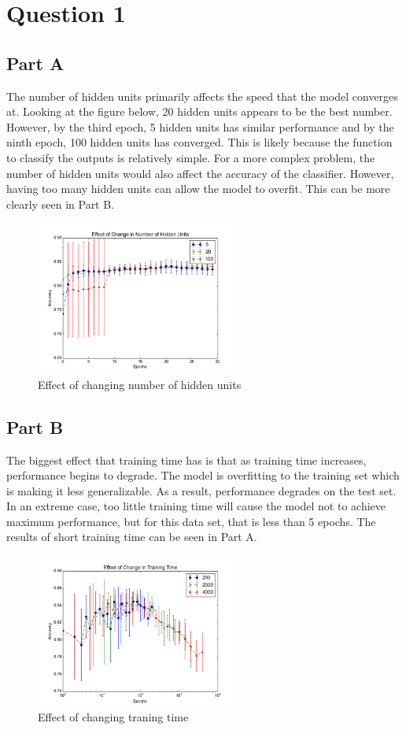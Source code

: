 \section{Question 1}
\subsection{Part A}
The number of hidden units primarily affects the speed that the model converges at.  Looking at the figure below, 20 hidden units appears to be the best number.  However, by the third epoch, 5 hidden units has similar performance and by the ninth epoch, 100 hidden units has converged.  This is likely because the function to classify the outputs is relatively simple.  For a more complex problem, the number of hidden units would also affect the accuracy of the classifier.  However, having too many hidden units can allow the model to overfit.  This can be more clearly seen in Part B.
\begin{figure}[H]
	\centering
	\includegraphics[width=0.6\textwidth]{../train1/hidden_units.png}
	\caption{Effect of changing number of hidden units}
\end{figure}

\subsection{Part B}
The biggest effect that training time has is that as training time increases, performance begins to degrade.  The model is overfitting to the training set which is making it less generalizable.  As a result, performance degrades on the test set.  In an extreme case, too little training time will cause the model not to achieve maximum performance, but for this data set, that is less than 5 epochs.  The results of short training time can be seen in Part A.
\begin{figure}[H]
	\centering
	\includegraphics[width=0.6\textwidth]{../train1/epochs.png}
	\caption{Effect of changing traning time}
\end{figure}

